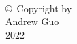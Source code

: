 
\thispagestyle{empty}
\hbox{\ }

\vfill

\vspace{.5in}

\begin{center}
\large{\copyright \hbox{ }Copyright by\\
Andrew Guo %
\\
2022}
\end{center}

\vfill

\newpage
